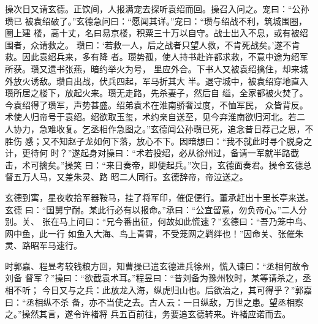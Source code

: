 操次日又请玄德。正饮间，人报满宠去探听袁绍而回。操召入问之。宠曰：“公孙瓒已
被袁绍破了。”玄德急问曰：“愿闻其详。”宠曰：“瓒与绍战不利，筑城围圈，圈上建
楼，高十丈，名曰易京楼，积粟三十万以自守。战士出入不息，或有被绍围者，众请救之。
瓒曰：‘若救一人，后之战者只望人救，不肯死战矣。’遂不肯救。因此袁绍兵来，多有降
者。瓒势孤，使人持书赴许都求救，不意中途为绍军所获。瓒又遗书张燕，暗约举火为号，
里应外合。下书人又被袁绍擒住，却来城外放火诱敌。瓒自出战，伏兵四起，军马折其大
半。退守城中，被袁绍穿地直入瓒所居之楼下，放起火来。瓒无走路，先杀妻子，然后自
缢，全家都被火焚了。今袁绍得了瓒军，声势甚盛。绍弟袁术在淮南骄奢过度，不恤军民，
众皆背反。术使人归帝号于袁绍。绍欲取玉玺，术约亲自送至，见今弃淮南欲归河北。若二
人协力，急难收复。乞丞相作急图之。”玄德闻公孙瓒已死，追念昔日荐己之恩，不胜伤
感；又不知赵子龙如何下落，放心不下。因暗想曰：“我不就此时寻个脱身之计，更待何
时？”遂起身对操曰：“术若投绍，必从徐州过，备请一军就半路截击，术可擒矣。”操笑
曰：“来日奏帝，即便起兵。”次日，玄德面奏君。操令玄德总督五万人马，又差朱灵、路
昭二人同行。玄德辞帝，帝泣送之。

玄德到寓，星夜收拾军器鞍马，挂了将军印，催促便行。董承赶出十里长亭来送。玄德
曰：“国舅宁耐。某此行必有以报命。”承曰：“公宜留意，勿负帝心。”二人分别。关、
张在马上问曰：“兄今番出征，何故如此慌速？”玄德曰：“吾乃笼中鸟、网中鱼，此一行
如鱼入大海、鸟上青霄，不受笼网之羁绊也！”因命关、张催朱灵、路昭军马速行。

时郭嘉、程昱考较钱粮方回，知曹操已遣玄德进兵徐州，慌入谏曰：“丞相何故令刘备
督军？”操曰：“欲截袁术耳。”程昱曰：“昔刘备为豫州牧时，某等请杀之，丞相不听；
今日又与之兵：此放龙入海，纵虎归山也。后欲治之，其可得乎？”郭嘉曰：“丞相纵不杀
备，亦不当使之去。古人云：一日纵敌，万世之患。望丞相察之。”操然其言，遂令许褚将
兵五百前往，务要追玄德转来。许褚应诺而去。

